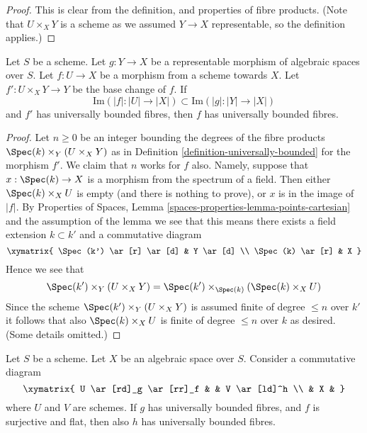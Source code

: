 \begin{proof}
This is clear from the definition, and properties of fibre products.
(Note that $U \times_X Y$ is a scheme
as we assumed $Y \to X$ representable, so the definition applies.)
\end{proof}

\begin{lemma}
\label{lemma-descent-universally-bounded}
Let $S$ be a scheme. Let $g : Y \to X$ be a representable morphism of
algebraic spaces over $S$. Let $f : U \to X$ be a morphism from a scheme
towards $X$. Let $f' : U \times_X Y \to Y$ be the base change of $f$.
If
$$
\text{Im}(|f| : |U| \to |X|) \subset \text{Im}(|g| : |Y| \to |X|)
$$
and $f'$ has universally bounded fibres, then $f$ has universally
bounded fibres.
\end{lemma}

\begin{proof}
Let $n \geq 0$ be an integer bounding the degrees of the fibre
products $\Spec(k) \times_Y (U \times_X Y)$ as in
Definition \ref{definition-universally-bounded} for the morphism $f'$.
We claim that $n$ works for $f$ also. Namely, suppose that
$x : \Spec(k) \to X$ is a morphism from the spectrum of
a field. Then either $\Spec(k) \times_X U$ is empty (and there
is nothing to prove), or $x$ is in the image of $|f|$. By
Properties of Spaces,
Lemma \ref{spaces-properties-lemma-points-cartesian}
and the assumption of the lemma we see
that this means there exists a field extension $k \subset k'$ and a
commutative diagram
$$
\xymatrix{
\Spec(k') \ar[r] \ar[d] & Y \ar[d] \\
\Spec(k) \ar[r] & X
}
$$
Hence we see that
$$
\Spec(k') \times_Y (U \times_X Y) =
\Spec(k') \times_{\Spec(k)} (\Spec(k) \times_X U)
$$
Since the scheme $\Spec(k') \times_Y (U \times_X Y)$ is assumed finite
of degree $\leq n$ over $k'$ it follows that also $\Spec(k) \times_X U$
is finite of degree $\leq n$ over $k$ as desired. (Some details omitted.)
\end{proof}

\begin{lemma}
\label{lemma-universally-bounded-permanence}
Let $S$ be a scheme. Let $X$ be an algebraic space over $S$.
Consider a commutative diagram
$$
\xymatrix{
U \ar[rd]_g \ar[rr]_f & & V \ar[ld]^h \\
& X &
}
$$
where $U$ and $V$ are schemes. If $g$ has universally bounded fibres,
and $f$ is surjective and flat, then also $h$ has universally bounded fibres.
\end{lemma}

